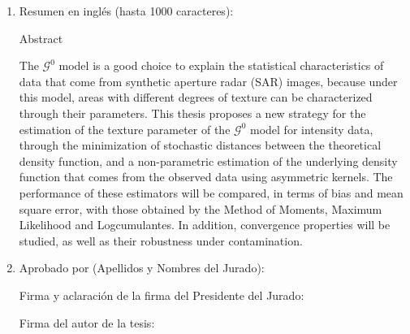\begin{enumerate}
	\item Resumen en inglés (hasta 1000 caracteres):
	
	Abstract
	
	The $\mathcal{G}^0$ model is a good choice to explain the statistical characteristics of data that come from synthetic aperture radar (SAR) images, because under this model, areas with different degrees of texture can be characterized through their parameters. This thesis proposes a new strategy for the estimation of the texture parameter of the $\mathcal G^0 $ model for intensity data, through the minimization of stochastic distances between the theoretical density function, and a non-parametric estimation of the underlying density function that comes from the observed data using asymmetric kernels. The performance of these estimators will be compared, in terms of bias and mean square error, with those obtained by the Method of Moments, Maximum Likelihood and Logcumulantes. In addition, convergence properties will be studied, as well as their robustness under contamination.
	
	\item Aprobado por (Apellidos y Nombres del Jurado):
	
	\bigskip\bigskip\bigskip\bigskip
	
	Firma y aclaración de la firma del Presidente del Jurado:				
	
	\bigskip\bigskip\bigskip\bigskip
	
	Firma del autor de la tesis:
	
\end{enumerate}

\newpage

